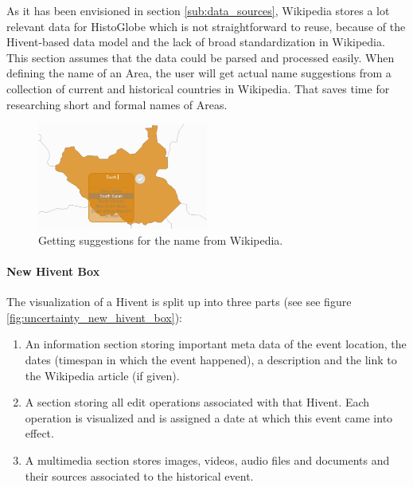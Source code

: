 As it has been envisioned in section \ref{sub:data_sources}, Wikipedia stores a lot relevant data for HistoGlobe which is not straightforward to reuse, because of the Hivent-based data model and the lack of broad standardization in Wikipedia. This section assumes that the data could be parsed and processed easily. When defining the name of an Area, the user will get actual name suggestions from a collection of current and historical countries in Wikipedia. That saves time for researching short and formal names of Areas.

\begin{figure}[H]
  \centering
  \includegraphics[width=0.5\textwidth]{graphics/extensions/new_name_tool}
  \caption{Getting suggestions for the name from Wikipedia.}
  \label{fig:uncertainty_new_name_tool}
\end{figure}

\paragraph{New Hivent Box} %
\label{par:new_hivent_box}

The visualization of a Hivent is split up into three parts (see see figure \ref{fig:uncertainty_new_hivent_box}):

\begin{enumerate}
  \item An information section storing important meta data of the event location, the dates (timespan in which the event happened), a description and the link to the Wikipedia article (if given).
  \item A section storing all edit operations associated with that Hivent. Each operation is visualized and is assigned a date at which this event came into effect.
  \item A multimedia section stores images, videos, audio files and documents and their sources associated to the historical event.
\end{enumerate}


